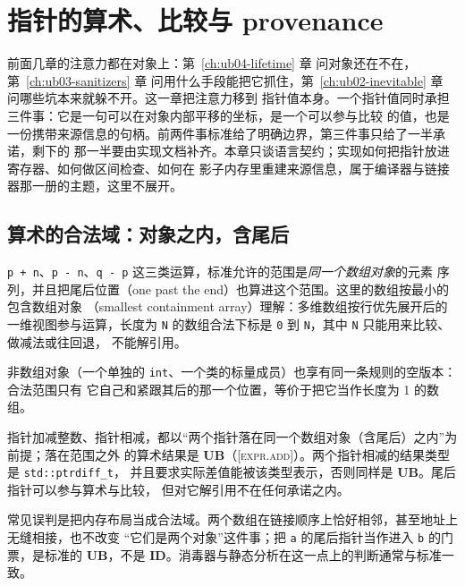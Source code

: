 \documentclass[12pt,a4paper,fontset=fandol]{ctexbook}
\newcommand{\Tp}[1]{\texttt{#1}}
\newcommand{\UB}{\textbf{\textsf{UB}}}
\newcommand{\IDB}{\textbf{\textsf{ID}}}
\newcommand{\Std}[1]{\textsc{[#1]}}
\begin{document}
\clearpage

\chapter{指针的算术、比较与 provenance}\label{ch:ub05-pointer}

前面几章的注意力都在对象上：第~\ref{ch:ub04-lifetime} 章 问对象还在不在，第~\ref{ch:ub03-sanitizers} 章
问用什么手段能把它抓住，第~\ref{ch:ub02-inevitable} 章 问哪些坑本来就躲不开。这一章把注意力移到
指针值本身。一个指针值同时承担三件事：它是一句可以在对象内部平移的坐标，是一个可以参与比较
的值，也是一份携带来源信息的句柄。前两件事标准给了明确边界，第三件事只给了一半承诺，剩下的
那一半要由实现文档补齐。本章只谈语言契约；实现如何把指针放进寄存器、如何做区间检查、如何在
影子内存里重建来源信息，属于编译器与链接器那一册的主题，这里不展开。

\section{算术的合法域：对象之内，含尾后}\label{sec:ub05-domain}

\Tp{p + n}、\Tp{p - n}、\Tp{q - p} 这三类运算，标准允许的范围是\emph{同一个数组对象}的元素
序列，并且把尾后位置（one past the end）也算进这个范围。这里的数组按最小的包含数组对象
（smallest containment array）理解：多维数组按行优先展开后的一维视图参与运算，长度为
\Tp{N} 的数组合法下标是 \Tp{0} 到 \Tp{N}，其中 \Tp{N} 只能用来比较、做减法或往回退，
不能解引用。

非数组对象（一个单独的 \Tp{int}、一个类的标量成员）也享有同一条规则的空版本：合法范围只有
它自己和紧跟其后的那一个位置，等价于把它当作长度为 1 的数组。

\begin{clause}[title={标准怎么说：指针算术与差值}]
指针加减整数、指针相减，都以“两个指针落在同一个数组对象（含尾后）之内”为前提；落在范围之外
的算术结果是 \UB{}（\Std{expr.add}）。两个指针相减的结果类型是 \Tp{std::ptrdiff\_t}，
并且要求实际差值能被该类型表示，否则同样是 \UB{}。尾后指针可以参与算术与比较，
但对它解引用不在任何承诺之内。
\end{clause}

常见误判是把内存布局当成合法域。两个数组在链接顺序上恰好相邻，甚至地址上无缝相接，也不改变
“它们是两个对象”这件事；把 \Tp{a} 的尾后指针当作进入 \Tp{b} 的门票，是标准的 \UB{}，不是
\IDB{}。消毒器与静态分析在这一点上的判断通常与标准一致。
\end{document}
